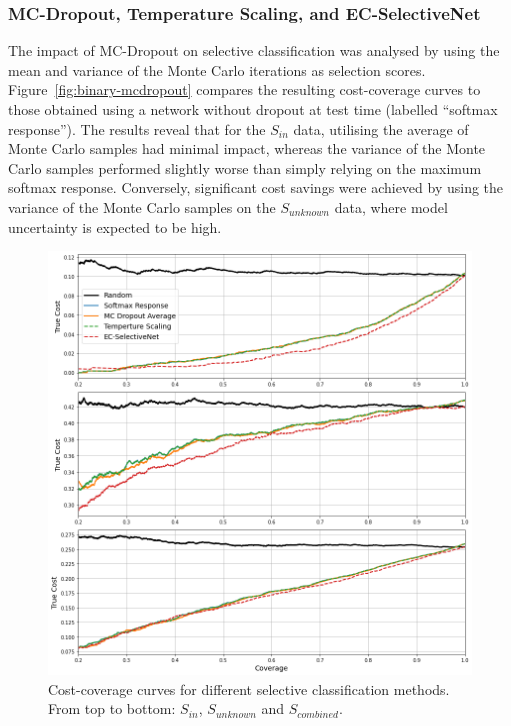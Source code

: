 \subsubsection{MC-Dropout, Temperature Scaling, and EC-SelectiveNet}
The impact of MC-Dropout on selective classification was analysed by using the mean and variance of the Monte Carlo iterations as selection scores. Figure~\ref{fig:binary-mcdropout} compares the resulting cost-coverage curves to those obtained using a network without dropout at test time (labelled “softmax response”). The results reveal that for the $S_{in}$ data, utilising the average of Monte Carlo samples had minimal impact, whereas the variance of the Monte Carlo samples performed slightly worse than simply relying on the maximum softmax response. Conversely, significant cost savings were achieved by using the variance of the Monte Carlo samples on the $S_{unknown}$ data, where model uncertainty is expected to be high.

\begin{figure}[!h]
	\centering
	\includegraphics[width=\textwidth]{images/binary_datasets.png}
	\caption{Cost-coverage curves for different selective classification methods. From top to bottom: $S_{in}$, $S_{unknown}$ and $S_{combined}$.}
	\label{fig:binary-datasets}
\end{figure}

